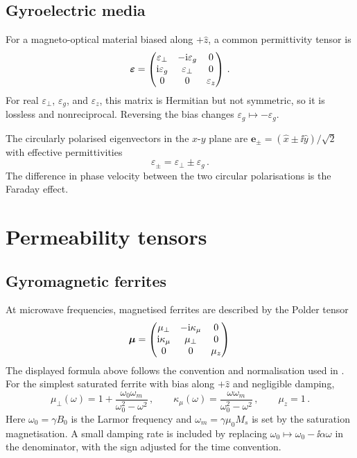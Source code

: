 \subsection{Gyroelectric media}
\label{sec:appD-gyroelectric}

For a magneto-optical material biased along $+\hat{z}$, a common
permittivity tensor is
\begin{equation}\label{eq:appD-eps-gyro}
  \boldsymbol{\varepsilon}=\begin{pmatrix}
    \varepsilon_\perp & -\mathrm{i}\varepsilon_g & 0\\
    \mathrm{i}\varepsilon_g & \varepsilon_\perp & 0\\
    0&0&\varepsilon_z
  \end{pmatrix}\,.
\end{equation}
For real $\varepsilon_\perp$, $\varepsilon_g$, and $\varepsilon_z$, this
matrix is Hermitian but not symmetric, so it is lossless and
nonreciprocal.  Reversing the bias changes
$\varepsilon_g\mapsto-\varepsilon_g$.

The circularly polarised eigenvectors in the $x$-$y$ plane are
$\mathbf{e}_\pm=(\hat{x}\pm\ii\hat{y})/\sqrt{2}$ with effective
permittivities
\begin{equation}\label{eq:appD-circular-eps}
  \varepsilon_\pm=\varepsilon_\perp\pm\varepsilon_g\,.
\end{equation}
The difference in phase velocity between the two circular polarisations
is the Faraday effect.

\section{Permeability tensors}
\label{sec:appD-mu}

\subsection{Gyromagnetic ferrites}
\label{sec:appD-ferrites}

At microwave frequencies, magnetised ferrites are described by the
Polder tensor
\begin{equation}\label{eq:appD-mu-polder}
  \boldsymbol{\mu}=\begin{pmatrix}
    \mu_\perp & -\mathrm{i}\kappa_\mu & 0\\
    \mathrm{i}\kappa_\mu & \mu_\perp & 0\\
    0&0&\mu_z
  \end{pmatrix}\,
\end{equation}
The displayed formula above follows the convention and normalisation used in \cite{he2016photonic}.
For the simplest saturated ferrite with bias along $+\hat{z}$ and
negligible damping,
\begin{equation}\label{eq:appD-polder-params}
  \mu_\perp(\omega)=1+\frac{\omega_0\omega_m}{\omega_0^2-\omega^2}\,,
  \qquad
  \kappa_\mu(\omega)=\frac{\omega\omega_m}{\omega_0^2-\omega^2}\,,
  \qquad \mu_z=1\,.
\end{equation}
Here $\omega_0=\gamma B_0$ is the Larmor frequency and
$\omega_m=\gamma\mu_0M_s$ is set by the saturation magnetisation.  A
small damping rate is included by replacing
$\omega_0\mapsto\omega_0-\ii\alpha\omega$ in the denominator, with the
sign adjusted for the time convention.

